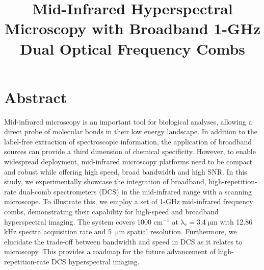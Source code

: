 \documentclass{optica-article}
\begin{document}
\title{Mid-Infrared Hyperspectral Microscopy with Broadband 1-GHz Dual Optical Frequency Combs}

\section{Abstract}

Mid-infrared microscopy is an important tool for biological analyses, allowing a direct probe of molecular bonds in their low energy landscape. In addition to the label-free extraction of spectroscopic information, the application of broadband sources can provide a third dimension of chemical specificity. However, to enable widespread deployment, mid-infrared microscopy platforms need to be compact and robust while offering high speed, broad bandwidth and high SNR. In this study, we experimentally showcase the integration of broadband, high-repetition-rate dual-comb spectrometers (DCS) in the mid-infrared range with a scanning microscope. To illustrate this, we employ a set of 1-GHz mid-infrared frequency combs, demonstrating their capability for high-speed and broadband hyperspectral imaging. The system covers 1000 $\mathrm{cm^{-1}}$ at \mbox{$\mathrm{\lambda_c=3.4 \; \mu m}$} with 12.86 kHz spectra acquisition rate and \mbox{5 $\mathrm{\mu m}$} spatial resolution. Furthermore, we elucidate the trade-off between bandwidth and speed in DCS as it relates to microscopy. This provides a roadmap for the future advancement of high-repetition-rate DCS hyperspectral imaging.
\end{document}
